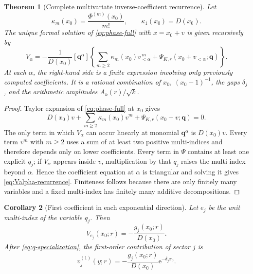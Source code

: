 \documentclass[11pt,a4paper]{article}
\numberwithin{equation}{section}
\newtheorem{theorem}{Theorem}[section]
\newtheorem{corollary}[theorem]{Corollary}
\theoremstyle{remark}
\newcommand{\e}{\mathrm e}
\begin{document}
\begin{theorem}[Complete multivariate inverse-coefficient recurrence]\label{thm:multivariate-recurrence}
Let
\begin{equation}\label{eq:kappa}
 \kappa_m(x_0)=\frac{\Phi^{(m)}(x_0)}{m!},\qquad
 \kappa_1(x_0)=D(x_0).
\end{equation}
The unique formal solution of \cref{eq:phase-full} with $x=x_0+v$ is given recursively by
\begin{equation}\label{eq:Valpha-recurrence}
 \boxed{
 V_\alpha=-\frac1{D(x_0)}[\bm q^\alpha]
 \left\{
 \sum_{m\ge2}\kappa_m(x_0)v_{<\alpha}^{\,m}
 +\Psi_{K,r}(x_0+v_{<\alpha};\bm q)
 \right\}.}
\end{equation}
At each $\alpha$, the right-hand side is a finite expression involving only previously computed coefficients.  It is a rational combination of $x_0$, $(x_0-1)^{-1}$, the gaps $\delta_j$, and the arithmetic amplitudes $A_k(r)/\sqrt{k}$.
\end{theorem}

\begin{proof}
Taylor expansion of \cref{eq:phase-full} at $x_0$ gives
\begin{equation}\label{eq:normalized-v-equation}
 D(x_0)v+\sum_{m\ge2}\kappa_m(x_0)v^m
 +\Psi_{K,r}(x_0+v;\bm q)=0.
\end{equation}
The only term in which $V_\alpha$ can occur linearly at monomial $\bm q^\alpha$ is $D(x_0)v$.  Every term $v^m$ with $m\ge2$ uses a sum of at least two positive multi-indices and therefore depends only on lower coefficients.  Every term in $\Psi$ contains at least one explicit $q_j$; if $V_\alpha$ appears inside $v$, multiplication by that $q_j$ raises the multi-index beyond $\alpha$.  Hence the coefficient equation at $\alpha$ is triangular and solving it gives \cref{eq:Valpha-recurrence}.  Finiteness follows because there are only finitely many variables and a fixed multi-index has finitely many additive decompositions.
\end{proof}

\begin{corollary}[First coefficient in each exponential direction]\label{cor:first-V}
Let $e_j$ be the unit multi-index of the variable $q_j$.  Then
\begin{equation}\label{eq:first-V}
 V_{e_j}(x_0;r)=-\frac{g_j(x_0;r)}{D(x_0)}.
\end{equation}
After \cref{eq:q-specialization}, the first-order contribution of sector $j$ is
\begin{equation}\label{eq:first-v-actual}
 v_j^{(1)}(y;r)=-\frac{g_j(x_0;r)}{D(x_0)}\e^{-\delta_jx_0}.
\end{equation}
\end{corollary}
\end{document}
